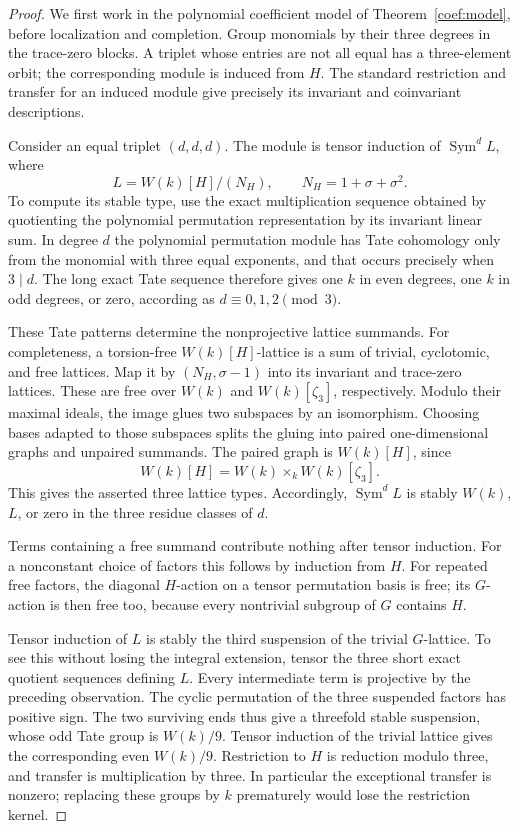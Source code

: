 \documentclass[11pt]{article}
\theoremstyle{definition}
\theoremstyle{remark}
\numberwithin{equation}{section}
\begin{document}
\begin{proof}
We first work in the polynomial coefficient model of
Theorem~\ref{coef:model}, before localization and completion.  Group
monomials by their three degrees in the trace-zero blocks.  A
triplet whose entries are not all equal has a three-element orbit;
the corresponding module is induced from $H$.  The standard
restriction and transfer for an induced module give precisely its
invariant and coinvariant descriptions.

Consider an equal triplet $(d,d,d)$.  The module is tensor induction
of $\operatorname{Sym}^d L$, where
\[
 L=W(k)[H]/(N_H),\qquad N_H=1+\sigma+\sigma^2.
\]
To compute its stable type, use the exact multiplication sequence
obtained by quotienting the polynomial permutation representation
by its invariant linear sum.  In degree $d$ the polynomial
permutation module has Tate cohomology only from the monomial with
three equal exponents, and that occurs precisely when $3\mid d$.
The long exact Tate sequence therefore gives one $k$ in even
degrees, one $k$ in odd degrees, or zero, according as
$d\equiv0,1,2\pmod3$.

These Tate patterns determine the nonprojective lattice summands.
For completeness, a torsion-free $W(k)[H]$-lattice is a sum of
trivial, cyclotomic, and free lattices.  Map it by $(N_H,\sigma-1)$
into its invariant and trace-zero lattices.  These are free over
$W(k)$ and $W(k)[\zeta_3]$, respectively.  Modulo their maximal
ideals, the image glues two subspaces by an isomorphism.  Choosing
bases adapted to those subspaces splits the gluing into paired
one-dimensional graphs and unpaired summands.  The paired graph
is $W(k)[H]$, since
\[
 W(k)[H]=W(k)\mathbin{\times}_{k}W(k)[\zeta_3].
\]
This gives the asserted three lattice types.  Accordingly,
$\operatorname{Sym}^dL$ is stably $W(k)$, $L$, or zero in the three residue
classes of $d$.

Terms containing a free summand contribute nothing after tensor
induction.  For a nonconstant choice of factors this follows by
induction from $H$.  For repeated free factors, the diagonal
$H$-action on a tensor permutation basis is free; its $G$-action
is then free too, because every nontrivial subgroup of $G$
contains $H$.

Tensor induction of $L$ is stably the third suspension of the
trivial $G$-lattice.  To see this without losing the integral
extension, tensor the three short exact quotient sequences
defining $L$.  Every intermediate term is projective by the
preceding observation.  The cyclic permutation of the three
suspended factors has positive sign.  The two surviving ends thus
give a threefold stable suspension, whose odd Tate group is
$W(k)/9$.  Tensor induction of the trivial lattice gives the
corresponding even $W(k)/9$.  Restriction to $H$ is reduction
modulo three, and transfer is multiplication by three.  In
particular the exceptional transfer is nonzero; replacing these
groups by $k$ prematurely would lose the restriction kernel.


\end{proof}
\end{document}
